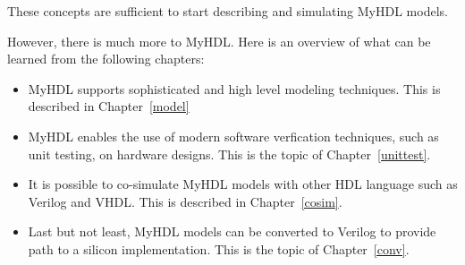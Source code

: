 These concepts are sufficient to start describing and simulating MyHDL models.

However, there is much more to MyHDL. Here is an overview of what can
be learned from the following chapters:

\begin{itemize}
\item MyHDL supports sophisticated and high level modeling techniques.
This is described in Chapter~\ref{model}

\item MyHDL enables the use of modern software verfication techniques,
such as unit testing, on hardware designs. This is the topic of
Chapter~\ref{unittest}.

\item It is possible to co-simulate MyHDL models with other HDL
language such as Verilog and VHDL. This is described in
Chapter~\ref{cosim}.

\item Last but not least, MyHDL models can be converted to
Verilog to provide path to a silicon implementation. This
is the topic of Chapter~\ref{conv}.
\end{itemize}
